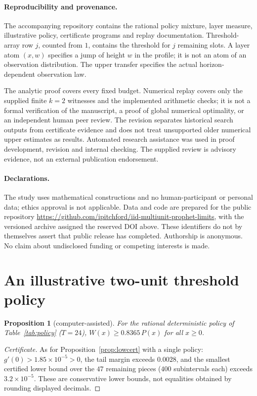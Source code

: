 \documentclass[11pt]{article}
\newtheorem{proposition}[theorem]{Proposition}
\theoremstyle{remark}
\begin{document}
\paragraph{Reproducibility and provenance.}
The accompanying repository contains the rational policy mixture, layer measure, illustrative policy, certificate programs and replay documentation. Threshold-array row $j$, counted from $1$, contains the threshold for $j$ remaining slots. A layer atom $(x,w)$ specifies a jump of height $w$ in the profile; it is not an atom of an observation distribution. The upper transfer specifies the actual horizon-dependent observation law.

The analytic proof covers every fixed budget. Numerical replay covers only the supplied finite $k=2$ witnesses and the implemented arithmetic checks; it is not a formal verification of the manuscript, a proof of global numerical optimality, or an independent human peer review. The revision separates historical search outputs from certificate evidence and does not treat unsupported older numerical upper estimates as results. Automated research assistance was used in proof development, revision and internal checking. The supplied review is advisory evidence, not an external publication endorsement.

\paragraph{Declarations.}
The study uses mathematical constructions and no human-participant or personal data; ethics approval is not applicable. Data and code are prepared for the public repository \url{https://github.com/ipitchford/iid-multiunit-prophet-limits}, with the versioned archive assigned the reserved DOI above. These identifiers do not by themselves assert that public release has completed. Authorship is anonymous. No claim about undisclosed funding or competing interests is made.

\appendix
\section{An illustrative two-unit threshold policy}\label{app:policy}
\begin{proposition}[computer-assisted]\label{prop:det}
For the rational deterministic policy of Table~\ref{tab:policy} ($T=24$), $W(x)\ge0.8365\,P(x)$ for all $x\ge0$.
\end{proposition}
\begin{proof}[Certificate]
As for Proposition~\ref{prop:lowcert} with a single policy: $g'(0)>1.85\times10^{-5}>0$, the tail margin exceeds $0.0028$, and the smallest certified lower bound over the $47$ remaining pieces ($400$ subintervals each) exceeds $3.2\times10^{-5}$. These are conservative lower bounds, not equalities obtained by rounding displayed decimals.
\end{proof}
\end{document}
